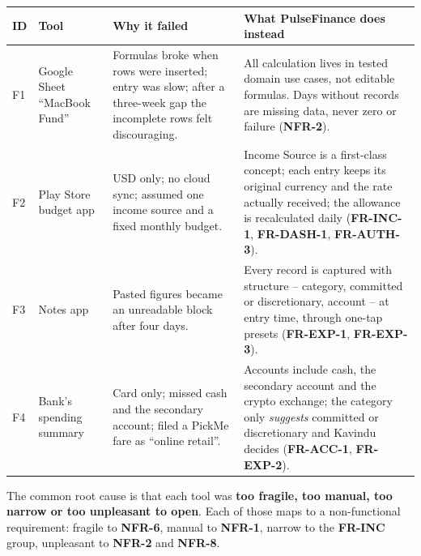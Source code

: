 \documentclass[11pt,a4paper]{article}
\newcommand{\req}[1]{\textsf{\textbf{\color{pfgreendark}#1}}}
\begin{document}
\begin{tabularx}{\textwidth}{|>{\raggedright\arraybackslash}p{0.6cm}|>{\raggedright\arraybackslash}p{2.5cm}|L|L|}
\hline
\textbf{ID} & \textbf{Tool} & \textbf{Why it failed} & \textbf{What PulseFinance does instead}\\
\hline
F1 & Google Sheet ``MacBook Fund'' & Formulas broke when rows were inserted; entry was slow; after a three-week gap the incomplete rows felt discouraging. & All calculation lives in tested domain use cases, not editable formulas. Days without records are missing data, never zero or failure (\req{NFR-2}).\\
F2 & Play Store budget app & USD only; no cloud sync; assumed one income source and a fixed monthly budget. & Income Source is a first-class concept; each entry keeps its original currency and the rate actually received; the allowance is recalculated daily (\req{FR-INC-1}, \req{FR-DASH-1}, \req{FR-AUTH-3}).\\
F3 & Notes app & Pasted figures became an unreadable block after four days. & Every record is captured with structure -- category, committed or discretionary, account -- at entry time, through one-tap presets (\req{FR-EXP-1}, \req{FR-EXP-3}).\\
F4 & Bank's spending summary & Card only; missed cash and the secondary account; filed a PickMe fare as ``online retail''. & Accounts include cash, the secondary account and the crypto exchange; the category only \emph{suggests} committed or discretionary and Kavindu decides (\req{FR-ACC-1}, \req{FR-EXP-2}).\\
\hline
\end{tabularx}

The common root cause is that each tool was \textbf{too fragile, too manual, too narrow or too unpleasant to open}. Each of those maps to a non-functional requirement: fragile to \req{NFR-6}, manual to \req{NFR-1}, narrow to the \req{FR-INC} group, unpleasant to \req{NFR-2} and \req{NFR-8}.
\end{document}
